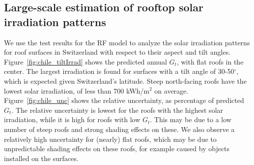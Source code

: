 \subsection{Large-scale estimation of rooftop solar irradiation patterns}
\label{chile_predict}

We use the test results for the RF model to analyze the solar irradiation patterns for roof surfaces in Switzerland with respect to their aspect and tilt angles. Figure~\ref{fig:chile_tiltIrrad} shows the predicted annual $G_t$, with flat roofs in the center. The largest irradiation is found for surfaces with a tilt angle of 30-50$^\circ$, which is expected given Switzerland’s latitude. Steep north-facing roofs have the lowest solar irradiation, of less than 700 kWh/m$^2$ on average. Figure~\ref{fig:chile_unc} shows the relative uncertainty, as percentage of predicted $G_t$. The relative uncertainty is lowest for the roofs with the highest solar irradiation, while it is high for roofs with low $G_t$. This may be due to a low number of steep roofs and strong shading effects on these. We also observe a relatively high uncertainty for (nearly) flat roofs, which may be due to unpredictable shading effects on these roofs, for example caused by objects installed on the surfaces.

